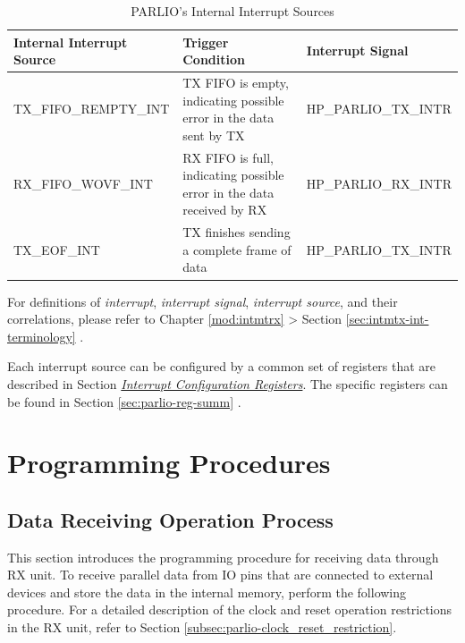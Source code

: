 \documentclass[main\_\_EN.tex]{subfiles}
\begin{document}
\begin{longtable}{ | L{4cm} | L{7.5cm} | L{4cm} | }
\caption{PARLIO's Internal Interrupt Sources} \label{tab:parlio-int-sources}
\\ \hline
{}
\textbf{Internal Interrupt Source} & \textbf{Trigger Condition}  &  \textbf{Interrupt Signal}\\ \hline
\label{int:TXFIFOREMPTYINT}TX\_FIFO\_REMPTY\_INT  &  TX FIFO is empty, indicating possible error in the data sent by TX &  HP\_PARLIO\_TX\_INTR \\ \hline
\label{int:RXFIFOWOVFINT}RX\_FIFO\_WOVF\_INT &  RX FIFO is full, indicating possible error in the data received by RX & HP\_PARLIO\_RX\_INTR \\ \hline
\label{int:TXEOFINT}TX\_EOF\_INT & TX finishes sending a complete frame of data & HP\_PARLIO\_TX\_INTR \\ \hline
\end{longtable}

\begin{tiplisting}
For definitions of \textit{interrupt}, \textit{interrupt signal}, \textit{interrupt source}, and their correlations, please refer to Chapter \ref{mod:intmtrx} \textit{} > Section \ref{sec:intmtx-int-terminology} \textit{}.
\end{tiplisting}

Each interrupt source can be configured by a common set of registers that are described in Section \hyperref[interrupt-config-registers]{\textit{Interrupt Configuration Registers}}. The specific registers can be found in Section \ref{sec:parlio-reg-summ} \textit{}.



\section{Programming Procedures}
\label{sec:parlio-prog-procedures}

\subsection{Data Receiving Operation Process}

This section introduces the programming procedure for receiving data through RX unit. To receive parallel data from IO pins that are connected to external devices and store the data in the internal memory, perform the following procedure. For a detailed description of the clock and reset operation restrictions in the RX unit, refer to Section \ref{subsec:parlio-clock_reset_restriction}.
\end{document}
